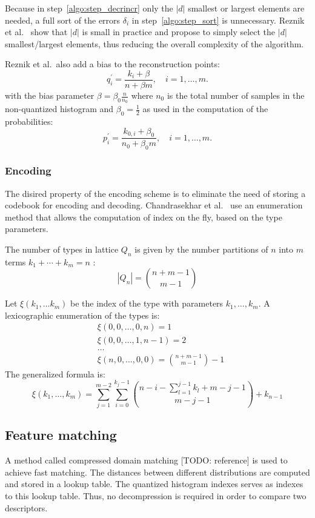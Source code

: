 Because in step~\ref{algo:step_decrincr} only the $\left|d\right|$ smallest or largest elements are needed, a full sort of the errors $\delta_i$ in step~\ref{algo:step_sort} is unnecessary. Reznik et al.\ \cite{fastchog} show that $\left|d\right|$ is small in practice and propose to simply select the $\left|d\right|$ smallest/largest elements, thus reducing the overall complexity of the algorithm.

Reznik et al.\ also add a bias to the reconstruction points:
\begin{equation}
    q_i^\prime = \frac{k_i + \beta}{n + \beta m}, \quad i = 1,\ldots,m.
\end{equation}
with the bias parameter $\beta = \beta_0\frac{n}{n_0}$ where $n_0$ is the total number of samples in the non-quantized histogram and $\beta_0 = \frac{1}{2}$ as used in the computation of the probabilities:
\begin{equation}
    p_i^\prime = \frac{k_{0,i} + \beta_0}{n_0 + \beta_0 m}, \quad i = 1,\ldots,m.
\end{equation}

\subsubsection{Encoding}

The disired property of the encoding scheme is to eliminate the need of storing a codebook for encoding and decoding. Chandrasekhar et al.\ \cite{chog2011} use an enumeration method that allows the computation of index on the fly, based on the type parameters.

The number of types in lattice $Q_n$ is given by the number partitions of $n$ into $m$ terms $k_1 + \cdots  + k_m = n$ \cite{chog2011}:
\begin{equation}
\left|Q_n\right| = {n+m-1 \choose m-1}
\end{equation}

Let $\xi(k_1, \ldots k_m)$ be the index of the type with parameters $k_1, \ldots, k_m$. A lexicographic enumeration of the types is:
\begin{align*}
&\xi(0,0,\ldots,0,n) = 1 \\
&\xi(0,0,\ldots,1,n-1) = 2 \\
&\ldots \\
&\xi(n,0,\ldots,0,0) = {n+m-1 \choose m-1} - 1
\end{align*}
The generalized formula \cite{chog2011} is:
\begin{equation}
\xi(k_1, \ldots, k_m) = \sum_{j=1}^{m-2} \sum_{i=0}^{k_j - 1} {n-i-\sum_{l=1}^{j-1}k_l+m-j-1 \choose m-j-1} + k_{n-1}
\end{equation}

\subsection{Feature matching}

A method called compressed domain matching [TODO: reference] is used to achieve fast matching. The distances between different distributions are computed and stored in a lookup table. The quantized histogram indexes serves as indexes to this lookup table. Thus, no decompression is required in order to compare two descriptors.
